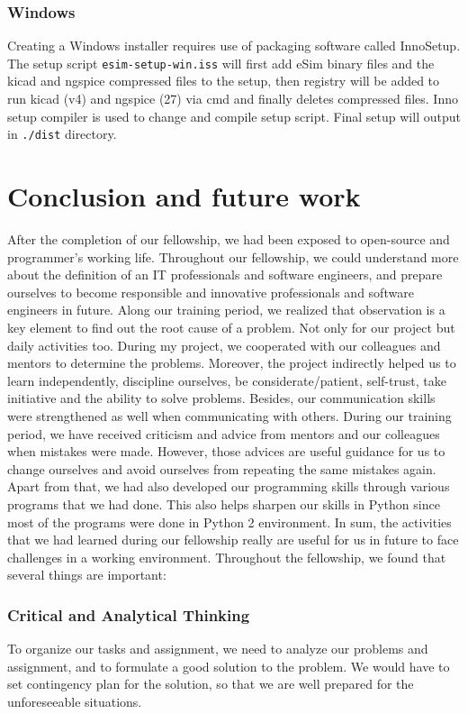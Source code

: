 \documentclass[12pt,a4paper]{report}
\begin{document}
\subsection{Windows}
Creating a Windows installer requires use of packaging software called InnoSetup.
\\
The setup script \texttt{esim-setup-win.iss} will first add eSim binary files and the kicad and ngspice compressed files to the setup, then registry will be added to run kicad (v4) and ngspice (27) via cmd and finally deletes compressed files. Inno setup compiler is used to change and compile setup script. Final setup will output in \texttt{./dist} directory.


\chapter{\textbf{Conclusion and future work}}
After the completion of our fellowship, we had been exposed to open-source and programmer's working life. Throughout our fellowship, we could understand more about the definition of an IT professionals and software engineers, and prepare ourselves to become responsible and innovative professionals and software engineers in future. Along our training period, we realized that observation is a key element to find out the root cause of a problem. Not only for our project but daily activities too. During my project, we cooperated with our colleagues and mentors to determine the problems. Moreover, the project indirectly helped us to learn independently, discipline ourselves, be considerate/patient, self-trust, take initiative and the ability to solve problems. Besides, our communication skills were strengthened as well when communicating with others. During our training period, we have received criticism and advice from mentors and our colleagues when mistakes were made. However, those advices are useful guidance for us to change ourselves and avoid ourselves from repeating the same mistakes again. Apart from that, we had also developed our programming skills through various programs that we had done. This also helps sharpen our skills in Python since most of the programs were done in Python 2 environment. In sum, the activities that we had learned during our fellowship really are useful for us in future to face challenges in a working environment. Throughout the fellowship, we found that several things are important: 

\subsection*{Critical and Analytical Thinking}
To organize our tasks and assignment, we need to analyze our problems and assignment, and to formulate a good solution to the problem. We would have to set contingency plan for the solution, so that we are well prepared for the unforeseeable situations. 
\end{document}
